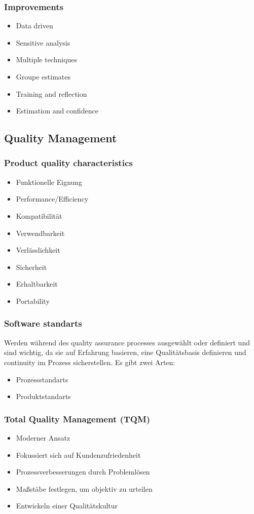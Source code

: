 \subsubsection{Improvements}
\begin{itemize}
	\item Data driven
	\item Sensitive analysis
	\item Multiple techniques
	\item Groupe estimates
	\item Training and reflection
	\item Estimation and confidence
\end{itemize}
\subsection{Quality Management}
\subsubsection{Product quality characteristics}
\begin{itemize}
	\item Funktionelle Eignung
	\item Performance/Efficiency
	\item Kompatibilität
	\item Verwendbarkeit
	\item Verlässlichkeit
	\item Sicherheit
	\item Erhaltbarkeit
	\item Portability
\end{itemize}
\subsubsection{Software standarts}
Werden während des quality assurance processes ausgewählt oder definiert und sind wichtig, da sie auf Erfahrung basieren, eine Qualitätsbasis definieren und continuity im Prozess sicherstellen. \newline
Es gibt zwei Arten:
\begin{itemize}
	\item Prozessstandarts 
	\item Produktstandarts
\end{itemize}
\subsubsection{Total Quality Management (TQM)}
\begin{itemize}
	\item Moderner Ansatz
	\item Fokussiert sich auf Kundenzufriedenheit
	\item Prozessverbesserungen durch Problemlösen
	\item Maßstäbe festlegen, um objektiv zu urteilen
	\item Entwickeln einer Qualitätskultur 
\end{itemize}
